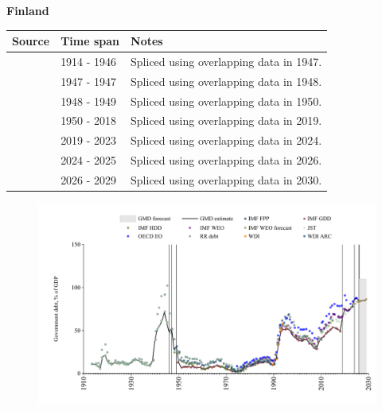 \documentclass[12pt,a4paper,landscape]{article}
\begin{document}
\begin{adjustbox}{max totalsize={\paperwidth}{\paperheight},center}
\begin{minipage}[t][\textheight][t]{\textwidth}
\vspace*{0.5cm}
{}
\begin{center}
{\Large\bfseries Finland}
\end{center}
\vspace{0.5cm}
\begin{table}[H]
\centering
\small
\begin{tabular}{|l|l|l|}
\hline
\textbf{Source} & \textbf{Time span} & \textbf{Notes} \\
\hline
\rowcolor{white}\cite{IMF_FPP}& 1914 - 1946 &Spliced using overlapping data in 1947.\\
\rowcolor{lightgray}\cite{JST}& 1947 - 1947 &Spliced using overlapping data in 1948.\\
\rowcolor{white}\cite{IMF_FPP}& 1948 - 1949 &Spliced using overlapping data in 1950.\\
\rowcolor{lightgray}\cite{IMF_GDD}& 1950 - 2018 &Spliced using overlapping data in 2019.\\
\rowcolor{white}\cite{IMF_FPP}& 2019 - 2023 &Spliced using overlapping data in 2024.\\
\rowcolor{lightgray}\cite{OECD_EO}& 2024 - 2025 &Spliced using overlapping data in 2026.\\
\rowcolor{white}\cite{IMF_WEO_forecast}& 2026 - 2029 &Spliced using overlapping data in 2030.\\
\hline
\end{tabular}
\end{table}
\begin{figure}[H]
\centering
\includegraphics[width=\textwidth,height=0.6\textheight,keepaspectratio]{graphs/FIN_govdebt_GDP.pdf}
\end{figure}
\end{minipage}
\end{adjustbox}
\end{document}
